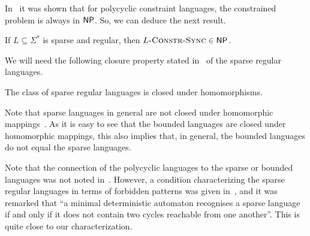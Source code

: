 In~\cite[Theorem 2]{DBLP:conf/ictcs/Hoffmann20} it was shown that for polycyclic
constraint languages, the constrained problem is always in $\textsf{NP}$.
So, we can deduce the next result.

\begin{theorem}
\label{thm:sparse_in_NP}
 If $L \subseteq \Sigma^*$ is sparse and regular, then $L\textsc{-Constr-Sync} \in \textsf{NP}$.
\end{theorem}

We will need the following closure property stated in~\cite[Theorem 3.8]{DBLP:reference/hfl/Yu97}
of the sparse regular languages.

\begin{proposition}
 The class of sparse regular languages is closed under homomorphisms.
\end{proposition}

\begin{toappendix}
Note that sparse languages in general are not closed
under homomorphic mappings~\cite{Pin2020}.
As it is easy to see that the bounded languages are closed
under homomorphic mappings, this also implies that, in general,
the bounded languages do not equal the sparse languages.
\end{toappendix}


Note that the connection of the polycyclic languages to the sparse or bounded languages
was not noted in~\cite{DBLP:conf/ictcs/Hoffmann20}. However, a condition
characterizing the sparse regular languages
in terms of forbidden patterns was given in~\cite{Pin2020}, and
it was remarked that ``a minimal deterministic automaton recognises a sparse language if and only if it
does not contain two cycles reachable from one another''.
This is quite close to our characterization.
